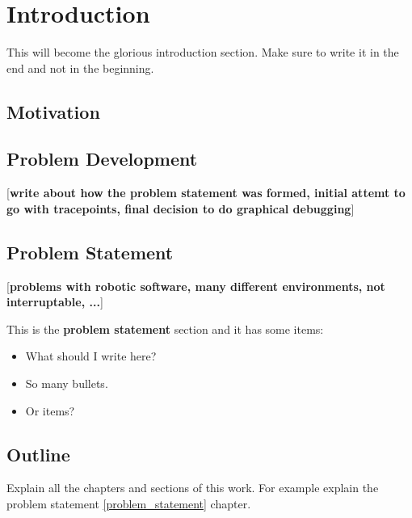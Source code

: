 \chapter{Introduction}

This will become the glorious introduction section. Make sure to write it in
the end and not in the beginning.

\section{Motivation}

\section{Problem Development}
[\textbf{write about how the problem statement was formed, initial attemt to go with tracepoints, final decision to do graphical debugging}]

\section{Problem Statement}
[\textbf{problems with robotic software, many different environments, not interruptable, ...}]

\label{problem_statement}
This is the \textbf{problem statement} section and it has some items:
\begin{itemize}
\item What should I write here?
\item So many bullets.
\item Or items?
\end{itemize}

\section{Outline}
Explain all the chapters and sections of this work. For example explain the problem statement
\ref{problem_statement} chapter.

